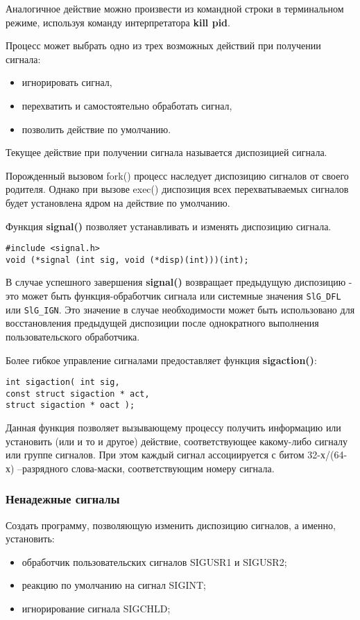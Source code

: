 \documentclass[a4paper]{article}
\begin{document}
	Аналогичное действие можно произвести из командной строки в терминальном режиме, используя команду интерпретатора \textbf{kill pid}.
	
	Процесс может выбрать одно из трех возможных действий при получении сигнала:
	\begin{itemize}
	\item игнорировать сигнал,
	\item перехватить и самостоятельно обработать сигнал,
	\item позволить действие по умолчанию.	
	\end{itemize}
	
	Текущее действие при получении сигнала называется диспозицией сигнала.
	
	Порожденный вызовом fork() процесс наследует диспозицию сигналов от своего родителя. Однако при вызове exec() диспозиция всех перехватываемых сигналов будет установлена ядром на действие по умолчанию.
	
	Функция \textbf{signal()} позволяет устанавливать и изменять диспозицию сигнала.
	\begin{lstlisting}[style=crs_cpp]
#include <signal.h>
void (*signal (int sig, void (*disp)(int)))(int);	
	\end{lstlisting}
	
	В случае успешного завершения \textbf{signal()} возвращает предыдущую диспозицию - это может быть функция-обработчик сигнала или системные значения \texttt{SlG\_DFL} или \texttt{SlG\_IGN}. Это значение в случае необходимости может быть использовано для восстановления предыдущей диспозиции после однократного выполнения пользовательского обработчика.
	
	Более гибкое управление сигналами предоставляет функция \textbf{sigaction()}:
	\begin{lstlisting}[style=crs_cpp]
int sigaction( int sig,
const struct sigaction * act,
struct sigaction * oact );
	\end{lstlisting}
	Данная функция позволяет вызывающему процессу получить информацию или установить (или и то и другое) действие, соответствующее какому-либо сигналу или группе сигналов. При этом каждый сигнал ассоциируется с битом 32-х/(64-х) –разрядного слова-маски, соответствующим номеру сигнала.
	
	\subsubsection{Ненадежные сигналы}
	Создать программу, позволяющую изменить диспозицию сигналов, а именно, установить:
	\begin{itemize}
	\item обработчик пользовательских сигналов SIGUSR1 и SIGUSR2;
	\item реакцию по умолчанию на сигнал SIGINT;
	\item игнорирование сигнала SIGCHLD;	
	\end{itemize}
\end{document}
